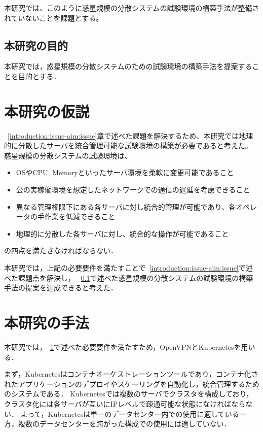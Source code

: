 本研究では、このように惑星規模の分散システムの試験環境の構築手法が整備されていないことを課題とする。

\subsection{本研究の目的}
\label{introduction:issue-aim:aim}

本研究では，惑星規模の分散システムのための試験環境の構築手法を提案することを目的とする．

\section{本研究の仮説}
\label{introduction:hypothesis}

~\ref{introduction:issue-aim:issue}章で述べた課題を解決するため、本研究では地理的に分散したサーバを統合管理可能な試験環境の構築が必要であると考えた。
惑星規模の分散システムの試験環境は、
\begin{itemize}
  \item OSやCPU, Memoryといったサーバ環境を柔軟に変更可能であること
  \item 公の実稼働環境を想定したネットワークでの通信の遅延を考慮できること
  \item 異なる管理権限下にある各サーバに対し統合的管理が可能であり、各オペレータの手作業を低減できること
  \item 地理的に分散した各サーバに対し、統合的な操作が可能であること
\end{itemize}
の四点を満たさなければならない．

本研究では，上記の必要要件を満たすことで~\ref{introduction:issue-aim:issue}で述べた課題点を解決し，
~\ref{introduction:issue-aim:aim}で述べた惑星規模の分散システムの試験環境の構築手法の提案を達成できると考えた．

\section{本研究の手法}
\label{introduction:proposal}

本研究では，~\ref{introduction:hypothesis}で述べた必要要件を満たすため，OpenVPNとKubernetesを用いる．

まず，Kubernetesはコンテナオーケストレーションツールであり，コンテナ化されたアプリケーションのデプロイやスケーリングを自動化し，統合管理するためのシステムである．
Kubernetesでは複数のサーバでクラスタを構成しており，クラスタ化には各サーバが互いにIPレベルで疎通可能な状態になければならない．
よって，Kubernetesは単一のデータセンター内での使用に適している一方，複数のデータセンターを跨がった構成での使用には適していない．

